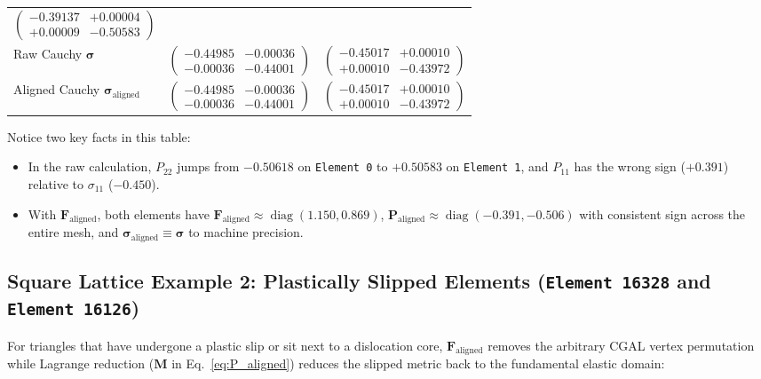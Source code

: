 \documentclass[11pt,a4paper]{article}
\newcommand{\code}[1]{\texttt{#1}}
\begin{document}
\begin{center}
\begin{tabular}{@{}lll@{}}
$\begin{pmatrix} -0.39137 & +0.00004 \\ +0.00009 & \mathbf{-0.50583} \end{pmatrix}$ \\[10pt]
Raw Cauchy $\boldsymbol{\sigma}$ &
$\begin{pmatrix} -0.44985 & -0.00036 \\ -0.00036 & -0.44001 \end{pmatrix}$ &
$\begin{pmatrix} -0.45017 & +0.00010 \\ +0.00010 & -0.43972 \end{pmatrix}$ \\[10pt]
Aligned Cauchy $\boldsymbol{\sigma}_{\text{aligned}}$ &
$\begin{pmatrix} -0.44985 & -0.00036 \\ -0.00036 & -0.44001 \end{pmatrix}$ &
$\begin{pmatrix} -0.45017 & +0.00010 \\ +0.00010 & -0.43972 \end{pmatrix}$ \\
\bottomrule
\end{tabular}
\end{center}

Notice two key facts in this table:
\begin{itemize}[noitemsep]
  \item In the raw calculation, $P_{22}$ jumps from $-0.50618$ on \code{Element 0} to $+0.50583$ on \code{Element 1}, and $P_{11}$ has the wrong sign ($+0.391$) relative to $\sigma_{11}$ ($-0.450$).
  \item With $\mathbf{F}_{\text{aligned}}$, both elements have $\mathbf{F}_{\text{aligned}} \approx \operatorname{diag}(1.150, 0.869)$, $\mathbf{P}_{\text{aligned}} \approx \operatorname{diag}(-0.391, -0.506)$ with consistent sign across the entire mesh, and $\boldsymbol{\sigma}_{\text{aligned}} \equiv \boldsymbol{\sigma}$ to machine precision.
\end{itemize}

\subsection{Square Lattice Example 2: Plastically Slipped Elements (\code{Element 16328} and \code{Element 16126})}
For triangles that have undergone a plastic slip or sit next to a dislocation core, $\mathbf{F}_{\text{aligned}}$ removes the arbitrary CGAL vertex permutation while Lagrange reduction ($\mathbf{M}$ in Eq.~\eqref{eq:P_aligned}) reduces the slipped metric back to the fundamental elastic domain:
\end{document}
